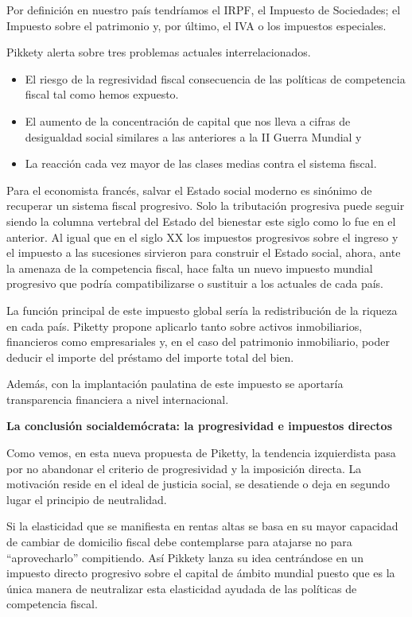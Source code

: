 \documentclass[
]{article}
\begin{document}
Por definición en nuestro país tendríamos el IRPF, el Impuesto de
Sociedades; el Impuesto sobre el patrimonio y, por último, el IVA o los
impuestos especiales.

Pikkety alerta sobre tres problemas actuales interrelacionados.

\begin{itemize}
\item
  El riesgo de la regresividad fiscal consecuencia de las políticas de
  competencia fiscal tal como hemos expuesto.
\item
  El aumento de la concentración de capital que nos lleva a cifras de
  desigualdad social similares a las anteriores a la II Guerra Mundial y
\item
  La reacción cada vez mayor de las clases medias contra el sistema
  fiscal.
\end{itemize}

Para el economista francés, salvar el Estado social moderno es sinónimo
de recuperar un sistema fiscal progresivo. Solo la tributación
progresiva puede seguir siendo la columna vertebral del Estado del
bienestar este siglo como lo fue en el anterior. Al igual que en el
siglo XX los impuestos progresivos sobre el ingreso y el impuesto a las
sucesiones sirvieron para construir el Estado social, ahora, ante la
amenaza de la competencia fiscal, hace falta un nuevo impuesto mundial
progresivo que podría compatibilizarse o sustituir a los actuales de
cada país.

La función principal de este impuesto global sería la redistribución de
la riqueza en cada país. Piketty propone aplicarlo tanto sobre activos
inmobiliarios, financieros como empresariales y, en el caso del
patrimonio inmobiliario, poder deducir el importe del préstamo del
importe total del bien.

Además, con la implantación paulatina de este impuesto se aportaría
transparencia financiera a nivel internacional.

\textbf{La conclusión socialdemócrata: la progresividad e impuestos
directos}

Como vemos, en esta nueva propuesta de Piketty, la tendencia
izquierdista pasa por no abandonar el criterio de progresividad y la
imposición directa. La motivación reside en el ideal de justicia social,
se desatiende o deja en segundo lugar el principio de neutralidad.

Si la elasticidad que se manifiesta en rentas altas se basa en su mayor
capacidad de cambiar de domicilio fiscal debe contemplarse para atajarse
no para ``aprovecharlo'' compitiendo. Así Pikkety lanza su idea
centrándose en un impuesto directo progresivo sobre el capital de ámbito
mundial puesto que es la única manera de neutralizar esta elasticidad
ayudada de las políticas de competencia fiscal.
\end{document}
